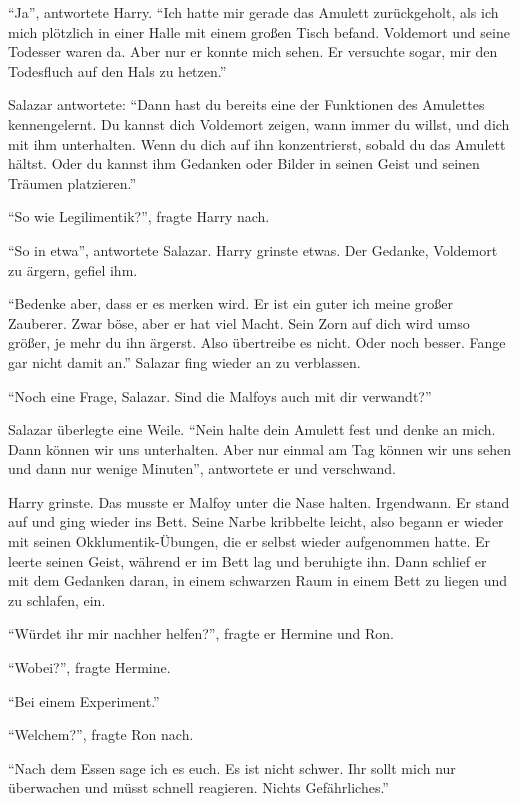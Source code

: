 \enquote{Ja}, antwortete Harry. \enquote{Ich hatte mir gerade das Amulett zurückgeholt, als ich mich plötzlich in einer Halle mit einem großen Tisch befand. Voldemort und seine Todesser waren da. Aber nur er konnte mich sehen. Er versuchte sogar, mir den Todesfluch auf den Hals zu hetzen.}

Salazar antwortete: \enquote{Dann hast du bereits eine der Funktionen des Amulettes kennengelernt. Du kannst dich Voldemort zeigen, wann immer du willst, und dich mit ihm unterhalten. \gst Wenn du dich auf ihn konzentrierst, sobald du das Amulett hältst. Oder du kannst ihm Gedanken oder Bilder in seinen Geist und seinen Träumen platzieren.}

\enquote{So wie Legilimentik?}, fragte Harry nach.

\enquote{So in etwa}, antwortete Salazar. Harry grinste etwas. Der Gedanke, Voldemort zu ärgern, gefiel ihm.

\enquote{Bedenke aber, dass er es merken wird. Er ist ein guter ich meine großer Zauberer. Zwar böse, aber er hat viel Macht. Sein Zorn auf dich wird umso größer, je mehr du ihn ärgerst. Also übertreibe es nicht. Oder noch besser. Fange gar nicht damit an.} Salazar fing wieder an zu verblassen.

\enquote{Noch eine Frage, Salazar. Sind die Malfoys auch mit dir verwandt?}

Salazar überlegte eine Weile. \enquote{Nein \gst halte dein Amulett fest und denke an mich. Dann können wir uns unterhalten. Aber nur einmal am Tag können wir uns sehen und dann nur wenige Minuten}, antwortete er und verschwand.

Harry grinste. Das musste er Malfoy unter die Nase halten. Irgendwann. Er stand auf und ging wieder ins Bett. Seine Narbe kribbelte leicht, also begann er wieder mit seinen Okklumentik-Übungen, die er selbst wieder aufgenommen hatte. Er leerte seinen Geist, während er im Bett lag und beruhigte ihn. Dann schlief er mit dem Gedanken daran, in einem schwarzen Raum in einem Bett zu liegen und zu schlafen, ein.

\trenn

\enquote{Würdet ihr mir nachher helfen?}, fragte er Hermine und Ron.

\enquote{Wobei?}, fragte Hermine.

\enquote{Bei einem Experiment.}

\enquote{Welchem?}, fragte Ron nach.

\enquote{Nach dem Essen sage ich es euch. Es ist nicht schwer. Ihr sollt mich nur überwachen und müsst schnell reagieren. Nichts Gefährliches.}

